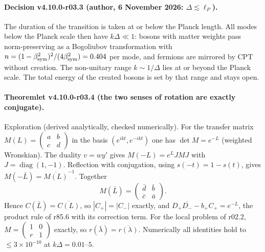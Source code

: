 \paragraph{Decision v4.10.0-r03.3 (author, 6 November 2026: \(\Delta\lesssim\ell_P\)).}
The duration of the transition is taken at or below the Planck length.  All modes below the Planck scale then have \(k\Delta\ll1\): bosons with matter
weights pass norm-preserving as a Bogoliubov transformation with \(n=(1-\beta_{\rm sym}^2)^2/(4\beta_{\rm sym}^2)=0.404\) per mode, and fermions are mirrored
by CPT without creation.  The non-unitary range \(k\sim1/\Delta\) lies at or beyond the Planck scale.  The total energy of the created bosons is set by
that range and stays open.

\paragraph{Theoremlet v4.10.0-r03.4 (the two senses of rotation are exactly conjugate).}
Exploration (derived analytically, checked numerically).  For the transfer matrix \(M(L)=\begin{pmatrix}a&b\\c&d\end{pmatrix}\) in the basis
\((e^{ikt},e^{-ikt})\) one has \(\det M=e^{-L}\) (weighted Wronskian).  The duality \(v=wy'\) gives \(M(-L)=e^L JMJ\) with \(J=\operatorname{diag}(1,-1)\).  Reflection
with conjugation, using \(s(-t)=1-s(t)\), gives \(M(-\bar L)=\overline{M(L)}^{-1}\).  Together
\[
M(\bar L)=\begin{pmatrix}\bar d&\bar b\\ \bar c&\bar a\end{pmatrix}.
\]
Hence \(C(\bar L)=\overline{C(L)}\), so \(|C_+|=|C_-|\) exactly, and \(D_+\overline{D_-}-b_+C_+=e^{-L}\), the product rule of r85.6 with its correction term.  For
the local problem of r02.2, \(M=\begin{pmatrix}1&0\\r&1\end{pmatrix}\) exactly, so \(r(\bar\lambda)=\overline{r(\lambda)}\).  Numerically all identities hold to
\(\le3\times10^{-10}\) at \(k\Delta=0.01\)--\(5\).

